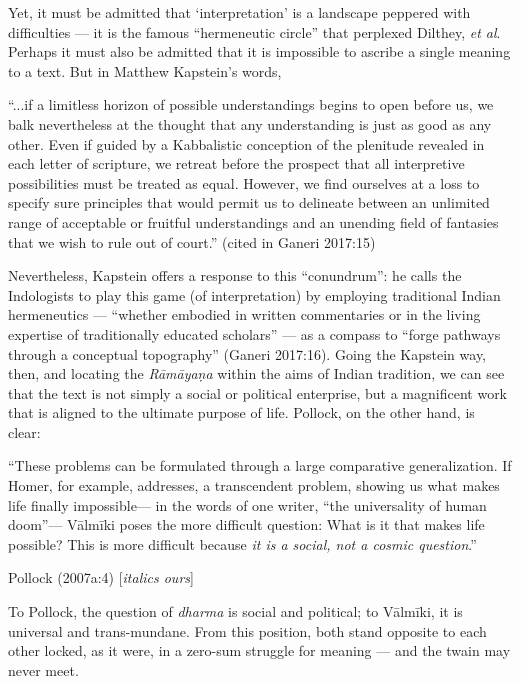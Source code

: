 Yet, it must be admitted that ‘interpretation’ is a landscape peppered with difficulties — it is the famous “hermeneutic circle” that perplexed Dilthey, {\sl et al}. Perhaps it must also be admitted that it is impossible to ascribe a single meaning to a text. But in Matthew Kapstein’s words, 

\begin{myquote}
“...if a limitless horizon of possible understandings begins to open before us, we balk nevertheless at the thought that any understanding is just as good as any other. Even if guided by a Kabbalistic conception of the plenitude revealed in each letter of scripture, we retreat before the prospect that all interpretive possibilities must be treated as equal. However, we find ourselves at a loss to specify sure principles that would permit us to delineate between an unlimited range of acceptable or fruitful understandings and an unending field of fantasies that we wish to rule out of court.”
\hfill (cited in Ganeri 2017:15) 
\end{myquote}

Nevertheless, Kapstein offers a response to this “conundrum”: he calls the Indologists to play this game (of interpretation) by employing traditional Indian hermeneutics — “whether embodied in written commentaries or in the living expertise of traditionally educated scholars” — as a compass to “forge pathways through a conceptual topography” (Ganeri 2017:16). Going the Kapstein way, then, and locating the {\sl Rāmāyaṇa} within the aims of Indian tradition, we can see that the text is not simply a social or political enterprise, but a magnificent work that is aligned to the ultimate purpose of life. Pollock, on the other hand, is clear:

\begin{myquote}
“These problems can be formulated through a large comparative generalization. If Homer, for example, addresses, a transcendent problem, showing us what makes life finally impossible— in the words of one writer, “the universality of human doom”— Vālmīki poses the more difficult question: What is it that makes life possible? This is more difficult because {\sl it is a social, not a cosmic question}.” 

\hfill Pollock (2007a:4) [{\sl italics ours}]
\end{myquote}

To Pollock, the question of {\sl dharma} is social and political; to Vālmīki, it is universal and trans-mundane. From this position, both stand opposite to each other locked, as it were, in a zero-sum struggle for meaning — and the twain may never meet. 

